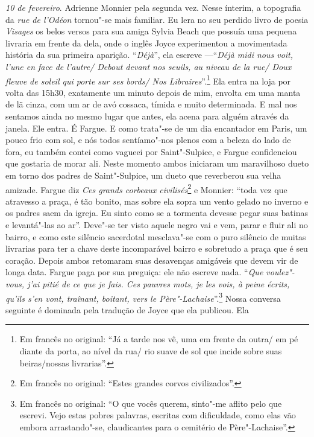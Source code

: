 \emph{10 de fevereiro}. Adrienne Monnier pela segunda vez. Nesse ínterim,
a topografia da \emph{rue de l'Odéon} tornou"-se mais familiar. Eu lera
no seu perdido livro de poesia \emph{Visages} os belos versos para sua
amiga Sylvia Beach que possuía uma pequena livraria em frente da dela,
onde o inglês Joyce experimentou a movimentada história da sua primeira
aparição. ``\emph{Déjà}'', ela escreve ---``\emph{Déjà midi nous voit,
l'une en face de l'autre/ Debout devant nos seuils, au niveau de la rue/ Doux fleuve de soleil qui porte sur ses bords/ Nos
Libraires}''.\footnote{Em francês no original: ``Já a tarde nos vê, uma em frente da outra/
  em pé diante da porta, ao nível da rua/ rio suave de sol que incide
  sobre suas beiras/nossas livrarias''. \versal{[N. T.]}} Ela
entra na loja por volta das 15h30, exatamente um minuto depois de mim,
envolta em uma manta de lã cinza, com um ar de avó cossaca, tímida e
muito determinada. E mal nos sentamos ainda no mesmo lugar que antes,
ela acena para alguém através da janela. Ele entra. É Fargue. E como
trata"-se de um dia encantador em Paris, um pouco frio com sol, e nós
todos sentíamo"-nos plenos com a beleza do lado de fora, eu também
contei como vagueei por Saint"-Sulpice, e Fargue confidenciou que
gostaria de morar ali. Neste momento ambos iniciaram um maravilhoso
dueto em torno dos padres de Saint"-Sulpice, um dueto que reverberou sua
velha amizade. Fargue diz \emph{Ces grands corbeaux civilisés}\footnote{Em francês no original:
  ``Estes grandes corvos civilizados''. \versal{[N.~T.]}} e
Monnier: ``toda vez que atravesso a praça, é tão bonito, mas sobre ela
sopra um vento gelado no inverno e os padres saem da igreja. Eu sinto
como se a tormenta devesse pegar suas batinas e levantá"-las ao ar''.
Deve"-se ter visto aquele negro vai e vem, parar e fluir ali no bairro, e
como este silêncio sacerdotal mesclava"-se com o puro silêncio de muitas
livrarias para ter a chave deste incomparável bairro e sobretudo a praça
que é seu coração. Depois ambos retomaram suas desavenças amigáveis que
devem vir de longa data. Fargue paga por sua preguiça: ele não escreve
nada. ``\emph{Que voulez"-vous, j'ai pitié de ce que je fais. Ces pauvres
mots, je les vois, à peine écrits, qu'ils s'en vont, traînant, boitant,
vers le Père"-Lachaise}''.\footnote{Em francês no original: ``O que vocês querem, sinto"-me
  aflito pelo que escrevi. Vejo estas pobres palavras, escritas com
  dificuldade, como elas vão embora arrastando"-se, claudicantes para o
  cemitério de Père"-Lachaise''. \versal{[N. T.]}} Nossa conversa
seguinte é dominada pela tradução de Joyce que ela publicou. Ela
